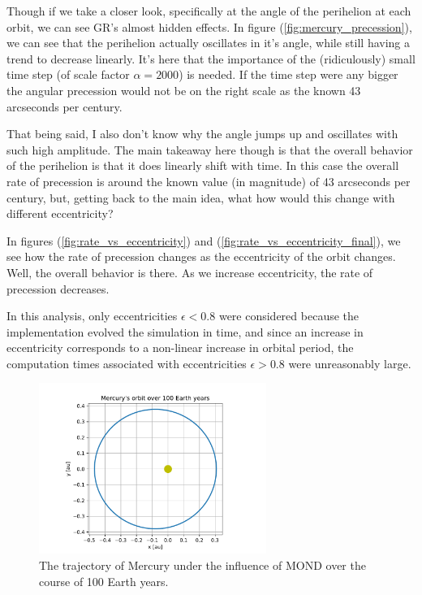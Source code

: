 \documentclass{report}
\begin{document}
            Though if we take a closer look, specifically at the angle of the perihelion at each orbit, we can see GR's almost hidden effects.  In figure (\ref{fig:mercury_precession}), we can see that the perihelion actually oscillates in it's angle, while still having a trend to decrease linearly.  It's here that the importance of the (ridiculously) small time step (of scale factor $\alpha = 2000$) is needed.  If the time step were any bigger the angular precession would not be on the right scale as the known 43 arcseconds per century. 
            
            That being said, I also don't know why the angle jumps up and oscillates with such high amplitude.  The main takeaway here though is that the overall behavior of the perihelion is that it does linearly shift with time.  In this case the overall rate of precession is around the known value (in magnitude) of 43 arcseconds per century, but, getting back to the main idea, what how would this change with different eccentricity?
            
            In figures (\ref{fig:rate_vs_eccentricity}) and (\ref{fig:rate_vs_eccentricity_final}), we see how the rate of precession changes as the eccentricity of the orbit changes.  Well, the overall behavior is there.  As we increase eccentricity, the rate of precession decreases.
            
            In this analysis, only eccentricities $\epsilon < 0.8$ were considered because the implementation evolved the simulation in time, and since an increase in eccentricity corresponds to a non-linear increase in orbital period, the computation times associated with eccentricities $\epsilon > 0.8$ were unreasonably large.
            
            \begin{figure}[h]
                \centering
                \includegraphics[width = 0.66\textwidth]{images/Trajectory_100.pdf}
                \caption{The trajectory of Mercury under the influence of MOND over the course of 100 Earth years.}
                \label{fig:mercury_trajectory}
            \end{figure} 
            
\end{document}
